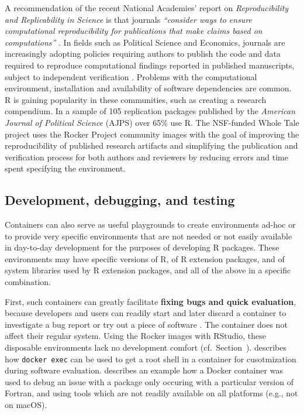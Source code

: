 A recommendation of the recent National Academies' report on
\emph{Reproducibility and Replicability in Science} is that journals
\emph{``consider ways to ensure computational reproducibility for
publications that make claims based on computations''}
\citep{NASEM2019}. In fields such as Political Science and Economics,
journals are increasingly adopting policies requiring authors to publish
the code and data required to reproduce computational findings reported
in published manuscripts, subject to independent verification
\citep{Jacoby2017,Vilhuber2019,Alvarez2018,Christian2018,Eubank2016,King1995}.
Problems with the computational environment, installation and
availability of software dependencies are common. R is gaining
popularity in these communities, such as creating a research compendium.
In a sample of 105 replication packages published by the \emph{American
Journal of Political Science} (AJPS) over 65\% use R. The NSF-funded
Whole Tale project uses the Rocker Project community images with the
goal of improving the reproducibility of published research artifacts
and simplifying the publication and verification process for both
authors and reviewers by reducing errors and time spent specifying the
environment.

\hypertarget{development-debugging-and-testing}{%
\subsection{Development, debugging, and
testing}\label{development-debugging-and-testing}}

\label{development}

Containers can also serve as useful playgrounds to create environments
ad-hoc or to provide very specific environments that are not needed or
not easily available in day-to-day development for the purposes of
developing R packages. These environments may have specific versions of
R, of R extension packages, and of system libraries used by R extension
packages, and all of the above in a specific combination.

First, such containers can greatly facilitate \textbf{fixing bugs and
quick evaluation}, because developers and users can readily start and
later discard a container to investigate a bug report or try out a piece
of software \citep[cf.][]{ooms_opencpu_2017}. The container does not
affect their regular system. Using the Rocker images with RStudio, these
disposable environments lack no development comfort
(cf.~Section~). \citet{ooms_opencpu_2017} describes
how \texttt{docker\ exec} can be used to get a root shell in a container
for cusotmization during software evaluation.
\citet{eddelbuettel_debugging_2019} describes an example how a Docker
container was used to debug an issue with a package only occuring with a
particular version of Fortran, and using tools which are not readily
available on all platforms (e.g., not on macOS).

